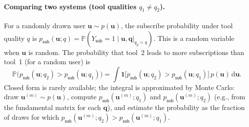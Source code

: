 \paragraph{Comparing two systems (tool qualities $q_1 \neq q_2$).}
For a randomly drawn user $\mathbf{u} \sim p(\mathbf{u})$, the subscribe probability under tool quality $q$ is $p_{\mathsf{sub}}(\mathbf{u}; q) = \mathbb{P}(Y_{\mathsf{sub}} = 1 \mid \mathbf{u}, \mathbf{q}\big|_{q_g = q})$. This is a random variable when $\mathbf{u}$ is random. The probability that tool~2 leads to more subscriptions than tool~1 (for a random user) is
\begin{equation}
  \mathbb{P}\bigl(p_{\mathsf{sub}}(\mathbf{u}; q_2) > p_{\mathsf{sub}}(\mathbf{u}; q_1)\bigr) = \int \mathbf{1}\bigl[p_{\mathsf{sub}}(\mathbf{u}; q_2) > p_{\mathsf{sub}}(\mathbf{u}; q_1)\bigr]\, p(\mathbf{u})\, \mathrm{d}\mathbf{u}. \label{eq:prob-q2-beats-q1}
\end{equation}
Closed form is rarely available; the integral is approximated by Monte Carlo: draw $\mathbf{u}^{(m)} \sim p(\mathbf{u})$, compute $p_{\mathsf{sub}}(\mathbf{u}^{(m)}; q_1)$ and $p_{\mathsf{sub}}(\mathbf{u}^{(m)}; q_2)$ (e.g., from the fundamental matrix for each $\mathbf{q}$), and estimate the probability as the fraction of draws for which $p_{\mathsf{sub}}(\mathbf{u}^{(m)}; q_2) > p_{\mathsf{sub}}(\mathbf{u}^{(m)}; q_1)$.

